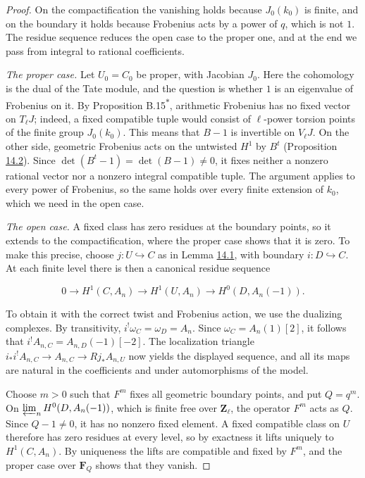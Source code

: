 \documentclass[11pt]{article}
\newcommand{\bpout}[1]{#1\textsuperscript{\hyperlink{bp-outside}{\ensuremath{\ast}}}}
\begin{document}
\begin{proof}[{Proof}]\label{bp14}%
On the compactification the vanishing holds because \(J_0(k_0)\) is finite, and on the boundary it holds because Frobenius acts by a power of \(q\), which is not \(1\). The residue sequence reduces the open case to the proper one, and at the end we pass from integral to rational coefficients.

\emph{The proper case.} Let \(U_0=C_0\) be proper, with Jacobian \(J_0\). Here the cohomology is the dual of the Tate module, and the question is whether \(1\) is an eigenvalue of Frobenius on it.  By Proposition \bpout{B.15}, arithmetic Frobenius has no fixed vector on \(T_\ell J\); indeed, a fixed compatible tuple would consist of \(\ell\)-power torsion points of the finite group \(J_0(k_0)\). This means that \(B-1\) is invertible on \(V_\ell J\).  On the other side, geometric Frobenius acts on the untwisted \(H^1\) by \(B^t\) (Proposition \hyperref[bp10]{14.2}). Since \(\det(B^t-1)=\det(B-1)\ne0\), it fixes neither a nonzero rational vector nor a nonzero integral compatible tuple.  The argument applies to every power of Frobenius, so the same holds over every finite extension of \(k_0\), which we need in the open case.

\emph{The open case.} A fixed class has zero residues at the boundary points, so it extends to the compactification, where the proper case shows that it is zero. To make this precise, choose \(j:U\hookrightarrow C\) as in Lemma \hyperref[bp7]{14.1}, with boundary \(i:D\hookrightarrow C\). At each finite level there is then a canonical residue sequence

\[
0\longrightarrow H^1(C,A_n)\longrightarrow H^1(U,A_n)
\longrightarrow H^0(D,A_n(-1)).
\]

To obtain it with the correct twist and Frobenius action, we use the dualizing complexes.  By transitivity, \(i^!\omega_C=\omega_D=A_n\). Since \(\omega_C=A_n(1)[2]\), it follows that \(i^!A_{n,C}=A_{n,D}(-1)[-2]\).  The localization triangle \(i_*i^!A_{n,C}\to A_{n,C}\to Rj_*A_{n,U}\) now yields the displayed sequence, and all its maps are natural in the coefficients and under automorphisms of the model.

Choose \(m>0\) such that \(F^m\) fixes all geometric boundary points, and put \(Q=q^m\).  On \(\varprojlim_nH^0(D,A_n(-1))\), which is finite free over \(\mathbf Z_\ell\), the operator \(F^m\) acts as \(Q\). Since \(Q-1\ne0\), it has no nonzero fixed element. A fixed compatible class on \(U\) therefore has zero residues at every level, so by exactness it lifts uniquely to \(H^1(C,A_n)\). By uniqueness the lifts are compatible and fixed by \(F^m\), and the proper case over \(\mathbf F_Q\) shows that they vanish.


\end{proof}
\end{document}

